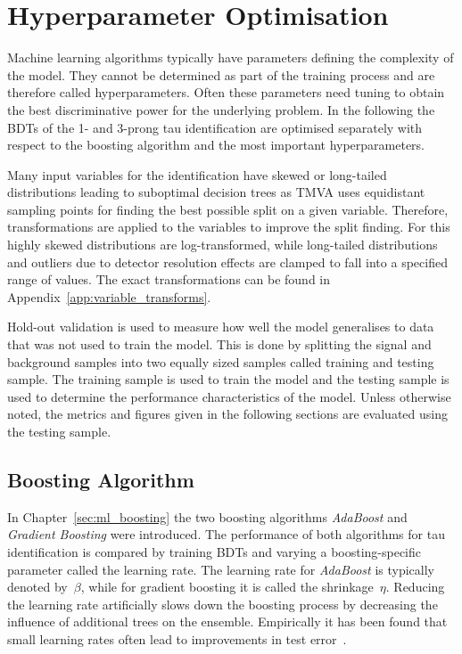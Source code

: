 

\section{Hyperparameter Optimisation}
\label{sec:bdt_hyperparam}

Machine learning algorithms typically have parameters defining the complexity of
the model. They cannot be determined as part of the training process and are
therefore called hyperparameters. Often these parameters need tuning to obtain
the best discriminative power for the underlying problem. In the following the
BDTs of the 1- and 3-prong tau identification are optimised separately with
respect to the boosting algorithm and the most important hyperparameters.

Many input variables for the identification have skewed or long-tailed
distributions leading to suboptimal decision trees as TMVA uses equidistant
sampling points for finding the best possible split on a given variable.
Therefore, transformations are applied to the variables to improve the split
finding. For this highly skewed distributions are log-transformed, while
long-tailed distributions and outliers due to detector resolution effects are
clamped to fall into a specified range of values. The exact transformations can
be found in Appendix~\ref{app:variable_transforms}.

Hold-out validation is used to measure how well the model generalises to data
that was not used to train the model. This is done by splitting the signal and
background samples into two equally sized samples called training and testing
sample. The training sample is used to train the model and the testing sample is
used to determine the performance characteristics of the model. Unless otherwise
noted, the metrics and figures given in the following sections are evaluated
using the testing sample.

\subsection{Boosting Algorithm}
\label{sec:bdt_boosting}

In Chapter~\ref{sec:ml_boosting} the two boosting algorithms \emph{AdaBoost} and
\emph{Gradient Boosting} were introduced. The performance of both algorithms for
tau identification is compared by training BDTs and varying a boosting-specific
parameter called the learning rate. The learning rate for \emph{AdaBoost} is
typically denoted by~$\beta$, while for gradient boosting it is called the
shrinkage~$\eta$. Reducing the learning rate artificially slows down the
boosting process by decreasing the influence of additional trees on the
ensemble. Empirically it has been found that small learning rates often lead to
improvements in test error~\cite{esl}.

